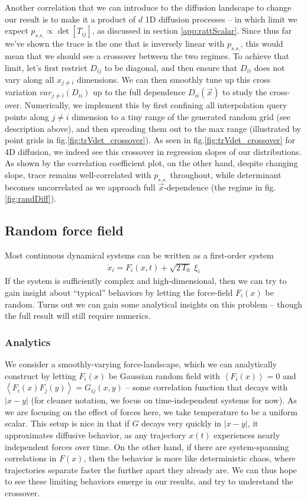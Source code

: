 \documentclass[reprint,prx]{revtex4-1}
\renewcommand{\=}[1]{\stackrel{#1}{=}} %
\renewcommand{\(}{\left (}
\renewcommand{\)}{\right  )}
\renewcommand{\[}{\left [}
\renewcommand{\]}{\right ]}
\newcommand{\<}{\left <}
\renewcommand{\>}{\right >}
\theoremstyle{definition}
\theoremstyle{remark}
\begin{document}
Another correlation that we can introduce to the diffusion landscape to change our result is to make it a product of $ d $ 1D diffusion processes -- in which limit we expect $ p_{s.s.}\propto \det\[T_{ij}\] $, as discussed in section \ref{app:rattScalar}. Since thus far we've shown the trace is the one that is inversely linear with $ p_{s.s.} $, this would mean that we should see a crossover between the two regimes. To achieve that limit, let's first restrict $ D_{ij} $ to be diagonal, and then ensure that $ D_{ii} $ does not vary along all $ x_{j\neq i} $ dimensions. We can then smoothly tune up this cross variation $ var_{j\neq i}(D_{ii}) $ up to the full dependence $ D_{ii}(\vec{x}) $ to study the cross-over. Numerically, we implement this by first confining all interpolation query points along $ j\neq i $ dimension to a tiny range of the generated random grid (see description above), and then spreading them out to the max range (illustrated by point grids in fig.\ref{fig:trVdet_crossover}). As seen in fig.\ref{fig:trVdet_crossover} for 4D diffusion, we indeed see this crossover in regression slopes of our distributions. As shown by the correlation coefficient plot, on the other hand, despite changing slope, trace remains well-correlated with $ p_{s.s.} $ throughout, while determinant becomes uncorrelated as we approach full $ \vec{x} $-dependence (the regime in fig.\ref{fig:randDiff}).

\subsection{Random force field}

Most continuous dynamical systems can be written as a first-order system
\begin{align} \label{eq:randForce}
\dot{x}_i = F_i(x,t)+\sqrt{2\,T_0}\;\xi_i
\end{align}
If the system is sufficiently complex and high-dimensional, then we can try to gain insight about ``typical'' behaviors by letting the force-field $ F_i(x) $ be random. Turns out we can gain some analytical insights on this problem -- though the full result will still require numerics. 

\subsubsection{Analytics}
We consider a smoothly-varying force-landscape, which we can analytically construct by letting $ F_i(x) $ be Gaussian random field with $ \<F_i(x)\>=0 $ and $ \<F_i(x) F_j(y)\>=G_{ij}(x,y) $ -- some correlation function that decays with $ |x-y| $ (for cleaner notation, we focus on time-independent systems for now). As we are focusing on the effect of forces here, we take temperature to be a uniform scalar. This setup is nice in that if $ G $ decays very quickly in $ |x-y| $, it approximates diffusive behavior, as any trajectory $ x(t) $ experiences nearly independent forces over time. On the other hand, if there are system-spanning correlations in $ F(x) $, then the behavior is more like deterministic chaos, where trajectories separate faster the further apart they already are. We can thus hope to see these limiting behaviors emerge in our results, and try to understand the crossover.
\end{document}
